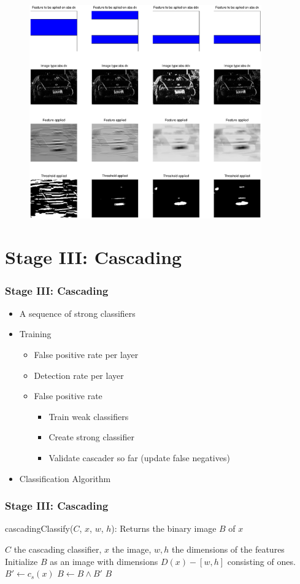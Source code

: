 \documentclass{beamer}
\begin{document}
\frame
{
	\begin{figure}[!ht]
	\centering
	\includegraphics[width=10cm]{../report/img/strongClassifier_layer2_img14}
	\label{fig:strongclassify}
	\end{figure}
}

\section{Stage III: Cascading}
\frame
{
  \frametitle{Stage III: Cascading}
	
  \begin{itemize}
  \item <+-| alert@+> A sequence of strong classifiers
  \item <+-| alert@+> Training
  \begin{itemize}
  	\item False positive rate per layer
  	\item Detection rate per layer
  	\item False positive rate
	\begin{itemize}
		\item <+| alert@+> Train weak classifiers
		\item <+| alert@+> Create strong classifier
		\item <+| alert@+> Validate cascader so far (update false negatives)
	\end{itemize}
  \end{itemize}
  \item <+-| alert@+> Classification Algorithm
  \end{itemize}
}

\frame
{
  \frametitle{Stage III: Cascading}
  \begin{algorithm}[H]
  	\caption{cascadingClassify($C$, $x$, $w$, $h$): Returns the binary image $B$ of $x$}
  	\begin{algorithmic}[1]
  	\REQUIRE $C$ the cascading classifier, $x$ the image, $w,h$ the dimensions of the features
  	\medskip
  	\STATE Initialize $B$ as an image with dimensions $D(x) - [w,h]$ consisting of ones.
  		\STATE $B' \leftarrow c_s(x)$
  		\STATE $B \leftarrow B \land B'$
  	\ENDFOR
  	\RETURN $B$
  	\end{algorithmic}
  \label{alg:casc}
  \end{algorithm}
}
\end{document}
